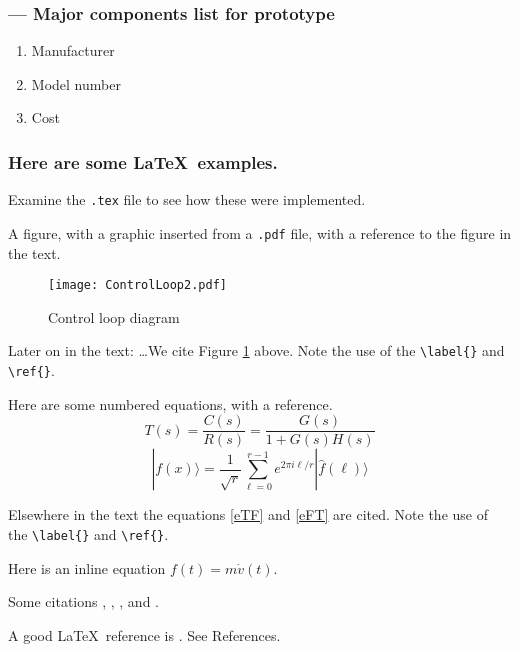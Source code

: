 \documentclass[twocolumn]{article}
\newcommand{\ket}[1]{|#1\rangle}
\begin{document}
\subsubsection*{ --- Major components list for prototype}
\begin{enumerate}
\item{Manufacturer}
\item{Model number}
\item{Cost}
\end{enumerate}

\newpage
\subsubsection*{Here are some \LaTeX\ examples.} 

Examine the \verb|.tex| file to see how these were implemented.

\vspace{.167in}
A figure, with a graphic inserted from a \verb|.pdf| file, with a reference to the figure in the text.
\begin{figure}[htbp]
\begin{center}
\texttt{[image: ControlLoop2.pdf]}
\caption{Control loop diagram}
\label{ControlLoop}
\end{center}
\end{figure}

Later on in the text: \dots We cite Figure \ref{ControlLoop} above.  Note the use of the \verb|\label{}| and \verb|\ref{}|.

Here are some numbered equations, with a reference.
\begin{equation}
T(s)=\frac{C(s)}{R(s)}=\frac{G(s)}{1+G(s)H(s)}
\label{eTF}
\end{equation}
\begin{equation}
\ket{f(x)} = \frac{1}{\sqrt{r}}\sum_{\ell=0}^{r-1}e^{2\pi i \ell/r}\ket{\hat{f}(\ell)}
\label{eFT}
\end{equation}

Elsewhere in  the text the equations \ref{eTF} and \ref{eFT} are cited. Note the use of the \verb|\label{}| and \verb|\ref{}|.

\vspace{.167in}
Here is an inline equation $f(t)=m\dot{v}(t)$. 
 
\vspace{.167in}
Some citations \cite{Bendat1971}, \cite{PhysRev.104.563}, \cite{Oppenheim1975}, and \cite{Papoulis1965}. 
 
\vspace{.167in}
A good \LaTeX\ reference is \cite{Lamport1994}.  See References.
\end{document}
